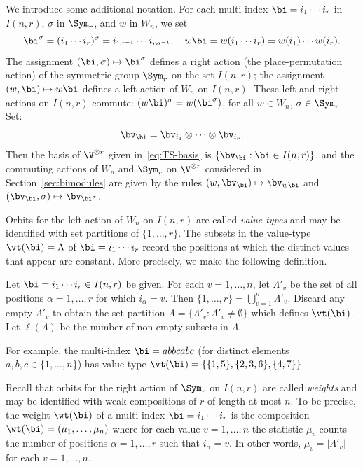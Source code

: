 We introduce some additional notation. For each multi-index $\bi =
i_1\cdots i_r$ in $I(n,r)$, $\sigma$ in $\Sym_r$, and $w$ in $W_n$, we
set
\[
 \bi^\sigma = (i_1\cdots i_r)^\sigma = i_{1 \sigma^{-1}} \cdots
 i_{r \sigma^{-1}}, \quad w \bi = w(i_1 \cdots i_r) = w(i_1) \cdots w(i_r).
\] 
The assignment $(\bi , \sigma) \mapsto \bi^\sigma$ defines a right
action (the place-permutation action) of the symmetric group $\Sym_r$
on the set $I(n,r)$; the assignment $(w,\bi) \mapsto w \bi$ defines a
left action of $W_n$ on $I(n,r)$. These left and right actions on
$I(n,r)$ commute: $(w\bi)^\sigma = w(\bi^\sigma)$, for all $w \in
W_n$, $\sigma \in \Sym_r$. Set:
\begin{equation}
 \bv_\bi = \bv_{i_1} \otimes \cdots \otimes \bv_{i_r}.
\end{equation}
Then the basis of $\V^{\otimes r}$ given in~\eqref{eq:TS-basis} is
$\{\bv_\bi: \bi \in I(n,r)\}$, and the commuting actions of $W_n$ and
$\Sym_r$ on $\V^{\otimes r}$ considered in Section~\ref{sec:bimodules}
are given by the rules $(w, \bv_\bi) \mapsto \bv_{w\bi}$ and
$(\bv_\bi, \sigma) \mapsto \bv_{\bi^\sigma}$.

Orbits for the left action of $W_n$ on $I(n,r)$ are called
\emph{value-types} and may be identified with set partitions of $\{1,
\dots, r\}$. The subsets in the value-type $\vt(\bi) = \Lambda$ of
$\bi = i_1 \cdots i_r$ record the positions at which the distinct
values that appear are constant. More precisely, we make the following
definition.

\begin{defi}\label{def:value-type}
 Let $\bi = i_1 \cdots i_r \in I(n,r)$ be given. For each $v =
 1, \dots, n$, let $\Lambda'_v$ be the set of all positions
 $\alpha = 1, \dots, r$ for which $i_\alpha = v$. Then $\{1, \dots,
 r\} = \bigcup_{v=1}^n \Lambda'_v$. Discard any empty $\Lambda'_v$ to
 obtain the set partition $\Lambda = \{ \Lambda'_v : \Lambda'_v \ne
 \emptyset\}$ which defines $\vt(\bi)$. Let $\ell(\Lambda)$ be the
 number of non-empty subsets in $\Lambda$.
\end{defi}

For example, the multi-index $\bi = abbcabc$ (for distinct elements
$a,b,c \in \{1, \dots, n\}$) has value-type $\vt(\bi) = \{\{1,5\},
\{2,3,6\}, \{4,7\}\}$.

Recall that orbits for the right action of $\Sym_r$ on $I(n,r)$ are
called \emph{weights} and may be identified with weak compositions of
$r$ of length at most $n$. To be precise, the weight $\wt(\bi)$ of a
multi-index $\bi = i_1 \cdots i_r$ is the composition $\wt(\bi) =
(\mu_1, \dots, \mu_n)$ where for each value $v = 1, \dots, n$ the
statistic $\mu_v$ counts the number of positions $\alpha = 1, \dots,
r$ such that $i_\alpha = v$. In other words, $\mu_v = |\Lambda'_v|$
for each $v = 1, \dots, n$.

